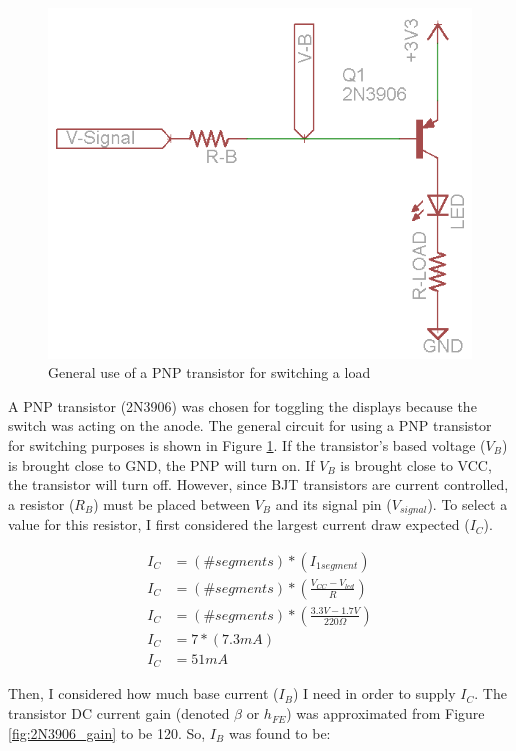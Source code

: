\documentclass[11pt]{article}
\begin{document}
\begin{figure}[h!]
\centering
\includegraphics[scale=0.5]{bjt.png}
\caption{General use of a PNP transistor for switching a load}
\label{fig:bjt}
\end{figure} 

A PNP transistor (2N3906) was chosen for toggling the displays because the switch was acting on the anode. The general circuit for using a PNP transistor for switching purposes is shown in Figure \ref{fig:bjt}. If the transistor's based voltage ($V_B$) is brought close to GND, the PNP will turn on. If $V_B$ is brought close to VCC, the transistor will turn off. However, since BJT transistors are current controlled, a resistor ($R_{B}$) must be placed between $V_B$ and its signal pin ($V_{signal}$). To select a value for this resistor, I first considered the largest current draw expected ($I_C$).

\begin{align*}
I_{C} &= (\# segments)*(I_{1segment}) \\
I_{C} &= (\# segments)*(\frac{V_{CC}-V_{led}}{R}) \\
I_{C} &= (\# segments)*(\frac{3.3V-1.7V}{220\Omega}) \\
I_{C} &= 7*(7.3mA) \\
I_{C} &= 51mA
\end{align*}

Then, I considered how much base current ($I_{B}$) I need in order to supply $I_{C}$. The transistor DC current gain (denoted $\beta$ or $h_{FE}$) was approximated from Figure \ref{fig:2N3906_gain} to be 120. So, $I_{B}$ was found to be: 
\end{document}
